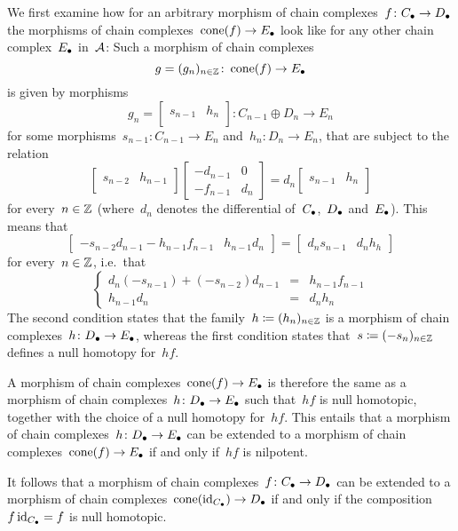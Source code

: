 \section{}


We first examine how for an arbitrary morphism of chain complexes~$f \colon C_\bullet \to D_\bullet$ the morphisms of chain complexes~$\operatorname{cone}(f) \to E_\bullet$ look like for any other chain complex~$E_\bullet$ in~$\mathcal{A}$:
Such a morphism of chain complexes
\[
          g
  =       (g_n)_{n \in \mathbb{Z}}
  \colon  \operatorname{cone}(f)
  \to     E_\bullet
\]
is given by morphisms
\[
          g_n
  =       \begin{bmatrix}
            s_{n-1} & h_n \\
          \end{bmatrix}
  \colon  C_{n-1} \oplus D_n
  \to     E_n
\]
for some morphisms~$s_{n-1} \colon C_{n-1} \to E_n$ and~$h_n \colon D_n \to E_n$, that are subject to the relation
\[
  \begin{bmatrix}
    s_{n-2} & h_{n-1} \\
  \end{bmatrix}
  \begin{bmatrix}
    -d_{n-1}  & 0   \\
    -f_{n-1}  & d_n
  \end{bmatrix}
  =
  d_n
  \begin{bmatrix}
    s_{n-1} & h_n \\
  \end{bmatrix}
\]
for every~$n \in \mathbb{Z}$ (where~$d_n$ denotes the differential of~$C_\bullet$,~$D_\bullet$ and~$E_\bullet$).
This means that
\[
  \begin{bmatrix}
    - s_{n-2} d_{n-1} - h_{n-1} f_{n-1} & h_{n-1} d_n
  \end{bmatrix}
  =
  \begin{bmatrix}
    d_n s_{n-1} & d_n h_h
  \end{bmatrix}
\]
for every~$n \in \mathbb{Z}$, i.e.\ that
\[
  \left\{
    \begin{array}{rcl}
      d_n (-s_{n-1}) + (-s_{n-2}) d_{n-1} &=&  h_{n-1} f_{n-1}  \\
      h_{n-1} d_n                         &=& d_n h_n
    \end{array}
  \right.
\]
The second condition states that the family~$h \coloneqq (h_n)_{n \in \mathbb{Z}}$ is a morphism of chain complexes~$h \colon D_\bullet \to E_\bullet$, whereas the first condition states that~$s \coloneqq (-s_n)_{n \in \mathbb{Z}}$ defines a null homotopy for~$hf$.

A morphism of chain complexes~$\operatorname{cone}(f) \to E_\bullet$ is therefore the same as a morphism of chain complexes~$h \colon D_\bullet \to E_\bullet$ such that~$hf$ is null homotopic, together with the choice of a null homotopy for~$hf$.
This entails that a morphism of chain complexes~$h \colon D_\bullet \to E_\bullet$ can be extended to a morphism of chain complexes~$\operatorname{cone}(f) \to E_\bullet$ if and only if~$hf$ is nilpotent.

It follows that a morphism of chain complexes~$f \colon C_\bullet \to D_\bullet$ can be extended to a morphism of chain complexes~$\operatorname{cone}(\operatorname{id}_{C_\bullet}) \to D_\bullet$ if and only if the composition~$f \operatorname{id}_{C_\bullet} = f$ is null homotopic.





